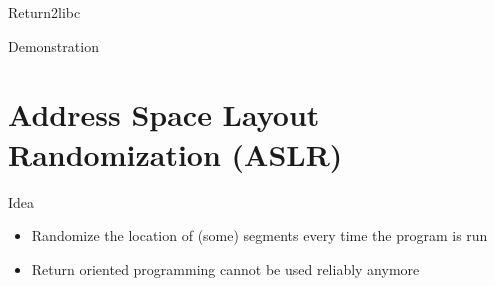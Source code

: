 \documentclass[beamer]{uibk}
\begin{document}
\begin{frame}{Return2libc}
    \begin{center}
        \huge Demonstration
    \end{center}
\end{frame}

\section{Address Space Layout Randomization (ASLR)}

\begin{frame}{Idea}
    \begin{itemize}
        \item Randomize the location of (some) segments every time the program
            is run
        \bigskip
        \pause
        \item Return oriented programming cannot be used reliably anymore
    \end{itemize}
\end{frame}
\end{document}
